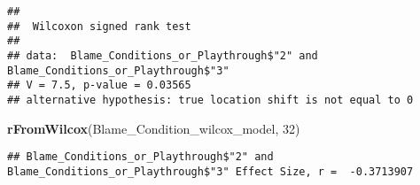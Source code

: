 \documentclass[
]{article}
\newenvironment{Shaded}{\begin{snugshade}}{\end{snugshade}}
\newcommand{\DecValTok}[1]{\textcolor[rgb]{0.00,0.00,0.81}{#1}}
\newcommand{\KeywordTok}[1]{\textcolor[rgb]{0.13,0.29,0.53}{\textbf{#1}}}
\newcommand{\NormalTok}[1]{#1}
\begin{document}
\begin{verbatim}
## 
##  Wilcoxon signed rank test
## 
## data:  Blame_Conditions_or_Playthrough$"2" and Blame_Conditions_or_Playthrough$"3"
## V = 7.5, p-value = 0.03565
## alternative hypothesis: true location shift is not equal to 0
\end{verbatim}

\begin{Shaded}
\begin{Highlighting}[]
\KeywordTok{rFromWilcox}\NormalTok{(Blame_Condition_wilcox_model, }\DecValTok{32}\NormalTok{)}
\end{Highlighting}
\end{Shaded}

\begin{verbatim}
## Blame_Conditions_or_Playthrough$"2" and Blame_Conditions_or_Playthrough$"3" Effect Size, r =  -0.3713907
\end{verbatim}
\end{document}

